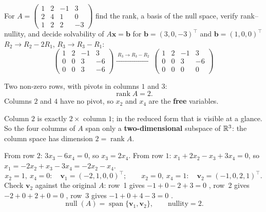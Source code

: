 \begin{worked}{For $A=\begin{pmatrix}1&2&-1&3\\2&4&1&0\\1&2&2&-3\end{pmatrix}$ find the rank, a basis of the null space, verify rank--nullity, and decide solvability of $A\mathbf x=\mathbf b$ for $\mathbf b=(3,0,-3)^{\!\top}$ and $\mathbf b=(1,0,0)^{\!\top}$}
$R_{2}\to R_{2}-2R_{1}$, $R_{3}\to R_{3}-R_{1}$:
\[
  \begin{pmatrix}1&2&-1&3\\0&0&3&-6\\0&0&3&-6\end{pmatrix}
  \xrightarrow{\;R_{3}\to R_{3}-R_{2}\;}
  \begin{pmatrix}1&2&-1&3\\0&0&3&-6\\0&0&0&0\end{pmatrix}
\]

Two non-zero rows, with pivots in columns $1$ and $3$:
\[
  \operatorname{rank}A=2 .
\]
Columns $2$ and $4$ have no pivot, so $x_{2}$ and $x_{4}$ are the
\textbf{free} variables.

Column $2$ is exactly $2\times$ column $1$; in the reduced form that is
visible at a glance. So the four columns of $A$ span only a
\textbf{two-dimensional} subspace of $\mathbb{R}^{3}$: the column space has
dimension $2=\operatorname{rank}A$.

From row $2$: $3x_{3}-6x_{4}=0$, so $x_{3}=2x_{4}$.
From row $1$: $x_{1}+2x_{2}-x_{3}+3x_{4}=0$, so
$x_{1}=-2x_{2}+x_{3}-3x_{4}=-2x_{2}-x_{4}$.
\[
  x_{2}=1,\ x_{4}=0:\quad \mathbf v_{1}=(-2,1,0,0)^{\!\top};
  \qquad
  x_{2}=0,\ x_{4}=1:\quad \mathbf v_{2}=(-1,0,2,1)^{\!\top}.
\]
Check $\mathbf v_{2}$ against the original $A$: row~1 gives
$-1+0-2+3=0$ \checkmark, row~2 gives $-2+0+2+0=0$ \checkmark, row~3 gives
$-1+0+4-3=0$ \checkmark.
\[
  \operatorname{null}(A)=\operatorname{span}\{\mathbf v_{1},\mathbf v_{2}\},
  \qquad \text{nullity}=2 .
\]


\end{worked}
